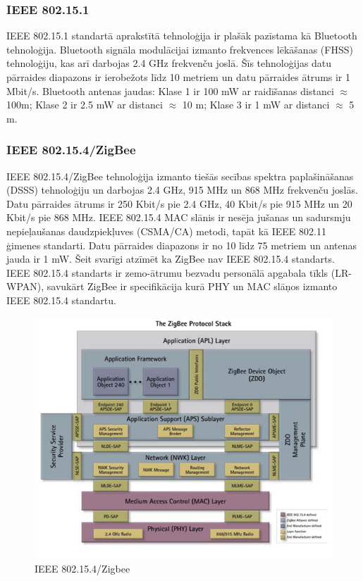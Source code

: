 \subsubsection{IEEE 802.15.1}
IEEE 802.15.1 standartā aprakstītā tehnoloģija ir plašāk pazīstama kā Bluetooth tehnoloģija. Bluetooth signāla modulācijai izmanto frekvences lēkāšanas (\acs{FHSS}) tehnoloģiju, kas arī darbojas 2.4 GHz frekvenču joslā. Šīs tehnoloģijas datu pārraides diapazons ir ierobežots līdz 10 metriem un datu pārraides ātrums ir 1 Mbit/s. Bluetooth antenas jaudas: Klase 1 ir 100 mW ar raidīšanas distanci $\approx$ 100m; Klase 2 ir 2.5 mW ar distanci $\approx$ 10 m; Klase 3 ir 1 mW ar distanci $\approx$ 5 m.

\subsubsection{IEEE 802.15.4/ZigBee}
IEEE 802.15.4/ZigBee tehnoloģija izmanto tiešās secības spektra paplašināšanas (\acs{DSSS}) tehnoloģiju un darbojas 2.4 GHz, 915 MHz un 868 MHz frekvenču joslās. Datu pārraides ātrums ir 250 Kbit/s pie 2.4 GHz, 40 Kbit/s pie 915 MHz un 20 Kbit/s pie 868 MHz. IEEE 802.15.4 MAC slānis ir nesēja jušanas un sadursmju nepieļaušanas daudzpiekļuves (\acs{CSMA/CA}) metodi, tapāt kā IEEE 802.11 ģimenes standarti. Datu pārraides diapazons ir no 10 līdz 75 metriem un antenas jauda ir 1 mW.
Šeit svarīgi atzīmēt ka ZigBee nav IEEE 802.15.4 standarts. IEEE 802.15.4 standarts ir zemo-ātrumu bezvadu personālā apgabala tīkls (\acs{LR-WPAN}), savukārt ZigBee ir specifikācija kurā PHY un MAC slāņos izmanto IEEE 802.15.4 standartu.
\begin{figure}
\centering
\includegraphics[scale=0.95]{./graph/zigBee.png}
\caption{IEEE 802.15.4/Zigbee \cite{libelium}}
\end{figure}

